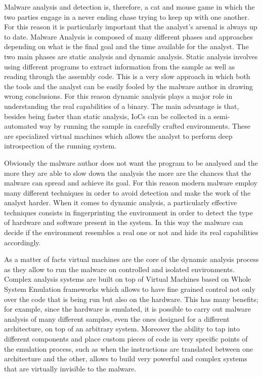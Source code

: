 Malware analysis and detection is, therefore, a cat and mouse game in which the two parties engage in a never ending chase trying to keep up with one another. For this reason it is particularly important that the analyst's arsenal is always up to date. Malware Analysis is composed of many different phases and approaches depending on what is the final goal and the time available for the analyst. The two main phases are static analysis and dynamic analysis. Static analysis involves using different programs to extract information from the sample as well as reading through the assembly code. This is a very slow approach in which both the tools and the analyst can be easily fooled by the malware author in drawing wrong conclusions. For this reason dynamic analysis plays a major role in understanding the real capabilities of a binary. The main advantage is that, besides being faster than static analysis, IoCs can be collected in a semi-automated way by running the sample in carefully crafted environments. These are specialized virtual machines which allows the analyst to perform deep introspection of the running system.

Obviously the malware author does not want the program to be analysed and the more they are able to slow down the analysis the more are the chances that the malware can spread and achieve its goal. For this reason modern malware employ many different techniques in order to avoid detection and make the work of the analyst harder. When it comes to dynamic analysis, a particularly effective techniques consists in fingerprinting the environment in order to detect the type of hardware and software present in the system. In this way the malware can decide if the environment resembles a real one or not and hide its real capabilities accordingly.

As a matter of facts virtual machines are the core of the dynamic analysis process as they allow to run the malware on controlled and isolated environments. Complex analysis systems are built on top of Virtual Machines based on Whole System Emulation frameworks which allows to have fine grained control not only over the code that is being run but also on the hardware. This has many benefits; for example, since the hardware is emulated, it is possible to carry out malware analysis of many different samples, even the ones designed for a different architecture, on top of an arbitrary system. Moreover the ability to tap into different components and place custom pieces of code in very specific points of the emulation process, such as when the instructions are translated between one architecture and the other, allows to build very powerful and complex systems that are virtually invisible to the malware.

